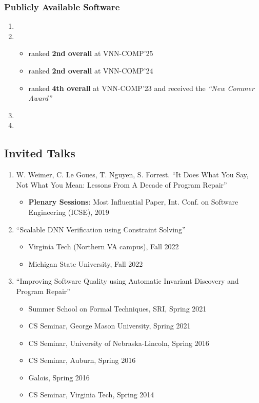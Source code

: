 \documentclass[11pt]{article}
\begin{document}
\subsubsection{Publicly Available Software}
\begin{enumerate}[label=S\arabic*]
    \item {}
    \item {}
        \begin{itemize}[before=\small]
        \item ranked \textbf{2nd overall} at VNN-COMP'25
        \item ranked \textbf{2nd overall} at VNN-COMP'24
        \item ranked \textbf{4th overall} at VNN-COMP'23 and received the \emph{``New Commer Award''}
    \end{itemize}
    \item {}
    \item {}
\end{enumerate}


\subsection{Invited Talks}
\begin{enumerate}[label=T\arabic*]
    \item W. Weimer, C. Le Goues, T. Nguyen, S. Forrest. ``It Does What You Say, Not What You Mean: Lessons From A Decade of Program Repair''
    \begin{itemize}[label={},before=\small]
        \item \textbf{Plenary Sessions}:  Most Influential Paper, Int. Conf. on Software Engineering (ICSE), 2019
    \end{itemize}
    
    \item ``Scalable DNN Verification using Constraint Solving''
    \begin{itemize}[label={},before=\small]
        \item Virginia Tech (Northern VA campus), Fall 2022
        \item Michigan State University, Fall 2022
    \end{itemize}
    
    \item ``Improving Software Quality using Automatic Invariant Discovery and Program Repair''
    \begin{itemize}[label={},before=\small]
        \item Summer School on Formal Techniques, SRI, Spring 2021
        \item CS Seminar, George Mason University, Spring 2021
        \item CS Seminar, University of Nebraska-Lincoln, Spring 2016
        \item CS Seminar, Auburn, Spring 2016
        \item Galois, Spring 2016
        \item CS Seminar, Virginia Tech, Spring 2014
    \end{itemize}
\end{enumerate}
\end{document}

